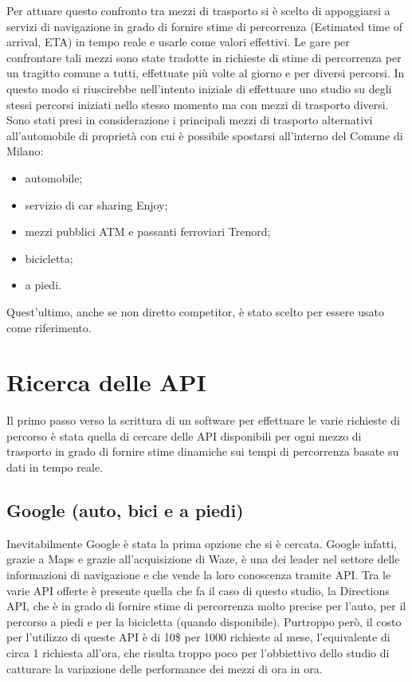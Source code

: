 Per attuare questo confronto tra mezzi di trasporto si è scelto di appoggiarsi a servizi di navigazione in grado di fornire stime di percorrenza (Estimated time of arrival, ETA) in tempo reale e usarle come valori effettivi. Le gare per confrontare tali mezzi sono state tradotte in richieste di stime di percorrenza per un tragitto comune a tutti, effettuate più volte al giorno e per diversi percorsi. In questo modo si riuscirebbe nell'intento iniziale di effettuare uno studio su degli stessi percorsi iniziati nello stesso momento ma con mezzi di trasporto diversi. Sono stati presi in considerazione i principali mezzi di trasporto alternativi all'automobile di proprietà con cui è possibile spostarsi all'interno del Comune di Milano:
\begin{itemize}
	\item automobile;
	\item servizio di car sharing Enjoy;
	\item mezzi pubblici ATM e passanti ferroviari Trenord;
	\item bicicletta;
	\item a piedi.
\end{itemize}
Quest'ultimo, anche se non diretto competitor, è stato scelto per essere usato come riferimento.

\section{Ricerca delle API}

Il primo passo verso la scrittura di un software per effettuare le varie richieste di percorso è stata quella di cercare delle API disponibili per ogni mezzo di trasporto in grado di fornire stime dinamiche sui tempi di percorrenza basate su dati in tempo reale.

\subsection{Google (auto, bici e a piedi)}

Inevitabilmente Google è stata la prima opzione che si è cercata. Google infatti, grazie a Maps e grazie all'acquisizione di Waze\cite{googleblog}, è una dei leader nel settore delle informazioni di navigazione e che vende la loro conoscenza tramite API. Tra le varie API offerte è presente quella che fa il caso di questo studio, la Directions API, che è in grado di fornire stime di percorrenza molto precise per l'auto, per il percorso a piedi e per la bicicletta (quando disponibile)\cite{googleapi}. Purtroppo però, il costo per l'utilizzo di queste API è di 10\$ per 1000 richieste al mese, l'equivalente di circa 1 richiesta all'ora, che risulta troppo poco per l'obbiettivo dello studio di catturare la variazione delle performance dei mezzi di ora in ora\cite{googleapiprice}.

